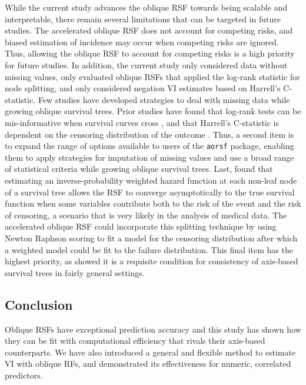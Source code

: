 \documentclass[12pt]{article}\usepackage[]{graphicx}\usepackage[]{xcolor}
\begin{document}
While the current study advances the oblique RSF towards being scalable and interpretable, there remain several limitations that can be targeted in future studies. The accelerated oblique RSF does not account for competing risks, and biased estimation of incidence may occur when competing risks are ignored. Thus, allowing the oblique RSF to account for competing risks is a high priority for future studies. In addition, the current study only considered data without missing values, only evaluated oblique RSFs that applied the log-rank statistic for node splitting, and only considered negation VI estimates based on Harrell's C-statistic. Few studies have developed strategies to deal with missing data while growing oblique survival trees. Prior studies have found that log-rank tests can be mis-informative when survival curves cross \citep{li2015statistical}, and that Harrell's C-statistic is dependent on the censoring distribution of the outcome \citep{uno2011c}. Thus, a second item is to expand the range of options available to users of the \texttt{aorsf} package, enabling them to apply strategies for imputation of missing values and use a broad range of statistical criteria while growing oblique survival trees. Last, \citet{cui2017consistency} found that estimating an inverse-probability weighted hazard function at each non-leaf node of a survival tree allows the RSF to converge asymptotically to the true survival function when some variables contribute both to the risk of the event and the risk of censoring, a scenario that is very likely in the analysis of medical data. The accelerated oblique RSF could incorporate this splitting technique by using Newton Raphson scoring to fit a model for the censoring distribution after which a weighted model could be fit to the failure distribution. This final item has the highest priority, as \citet{cui2017consistency} showed it is a requisite condition for consistency of axis-based survival trees in fairly general settings.


\subsection{Conclusion}

Oblique RSFs have exceptional prediction accuracy and this study has shown how they can be fit with computational efficiency that rivals their axis-based counterparts. We have also introduced a general and flexible method to estimate VI with oblique RFs, and demonstrated its effectiveness for numeric, correlated predictors.
\end{document}
